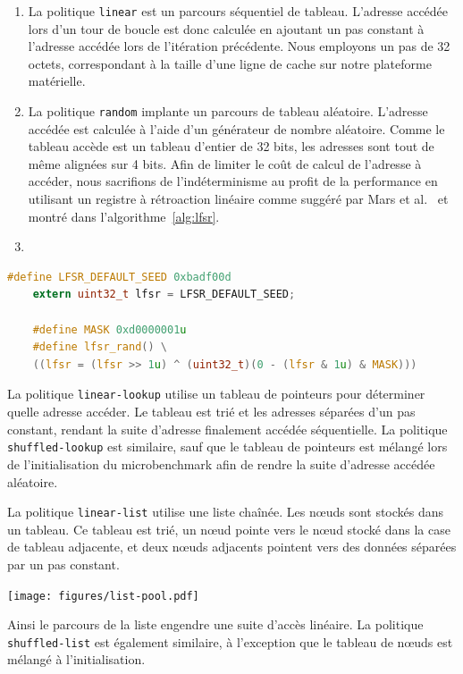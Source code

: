 \begin{enumerate}
	\item La politique \texttt{linear} est un parcours séquentiel de tableau.
	L'adresse accédée lors d'un tour de boucle est donc calculée en ajoutant un pas constant à l'adresse accédée lors de l'itération précédente.
	Nous employons un pas de 32 octets, correspondant à la taille d'une ligne de cache sur notre plateforme matérielle.

	\item  La politique \texttt{random} implante un parcours de tableau aléatoire.
	L'adresse accédée est calculée à l'aide d'un générateur de nombre aléatoire.
	Comme le tableau accède est un tableau d'entier de 32 bits, les adresses sont tout de même alignées sur 4 bits.
	Afin de limiter le coût de calcul de l'adresse à accéder, nous sacrifions de l'indéterminisme au profit de la performance en utilisant un registre à rétroaction linéaire comme suggéré par Mars et al.~\cite{mars2011bubble} et montré dans l'algorithme~\ref{alg:lfsr}.

	\item 

\end{enumerate}

\begin{lstlisting}[language=c, label=alg:lfsr, caption=Générateur de nombre pseudo-aléatoire utilisé dans la politique \texttt{random}~\cite{mars2011bubble}]
	#define LFSR_DEFAULT_SEED 0xbadf00d
	extern uint32_t lfsr = LFSR_DEFAULT_SEED;
	
	#define MASK 0xd0000001u
	#define lfsr_rand() \
	((lfsr = (lfsr >> 1u) ^ (uint32_t)(0 - (lfsr & 1u) & MASK)))
\end{lstlisting}

La politique \texttt{linear-lookup} utilise un tableau de pointeurs pour déterminer quelle adresse accéder.
Le tableau est trié et les adresses séparées d'un pas constant, rendant la suite d'adresse finalement accédée séquentielle.
La politique \texttt{shuffled-lookup} est similaire, sauf que le tableau de pointeurs est mélangé lors de l'initialisation du microbenchmark afin de rendre la suite d'adresse accédée aléatoire.

La politique \texttt{linear-list} utilise une liste chaînée.
Les nœuds sont stockés dans un tableau.
Ce tableau est trié, un nœud pointe vers le nœud stocké dans la case de tableau adjacente, et deux nœuds adjacents pointent vers des données séparées par un pas constant. 
\begin{center}
	\texttt{[image: figures/list-pool.pdf]}
\end{center}
Ainsi le parcours de la liste engendre une suite d'accès linéaire.
La politique \texttt{shuffled-list} est également similaire, à l'exception que le tableau de nœuds est mélangé à l'initialisation.

